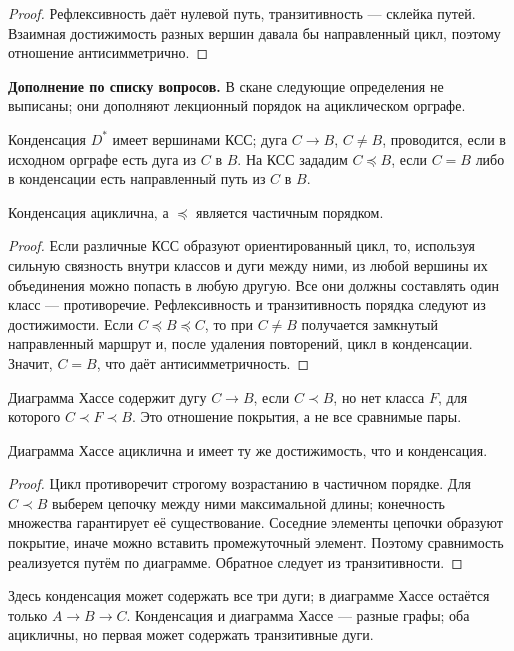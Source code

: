 \begin{proof}
Рефлексивность даёт нулевой путь, транзитивность — склейка путей.
Взаимная достижимость разных вершин давала бы направленный цикл,
поэтому отношение антисимметрично.
\end{proof}
\textbf{Дополнение по списку вопросов.} В скане следующие определения
не выписаны; они дополняют лекционный порядок на ациклическом орграфе.
\begin{definition}
Конденсация \(D^*\) имеет вершинами КСС; дуга \(C\to B\), \(C\ne B\),
проводится, если в исходном орграфе есть дуга из \(C\) в \(B\).
На КСС зададим \(C\preceq B\), если \(C=B\) либо в конденсации есть
направленный путь из \(C\) в \(B\).
\end{definition}
\begin{theorem}
Конденсация ациклична, а \(\preceq\) является частичным порядком.
\end{theorem}
\begin{proof}
Если различные КСС образуют ориентированный цикл, то, используя
сильную связность внутри классов и дуги между ними, из любой вершины
их объединения можно попасть в любую другую. Все они должны составлять
один класс — противоречие. Рефлексивность и транзитивность порядка
следуют из достижимости. Если \(C\preceq B\preceq C\), то при \(C\ne B\)
получается замкнутый направленный маршрут и, после удаления повторений,
цикл в конденсации. Значит, \(C=B\), что даёт антисимметричность.
\end{proof}


\begin{definition}
Диаграмма Хассе содержит дугу \(C\to B\), если \(C\prec B\), но нет
класса \(F\), для которого \(C\prec F\prec B\).
Это отношение покрытия, а не все сравнимые пары.
\end{definition}
\begin{lemma}
Диаграмма Хассе ациклична и имеет ту же достижимость, что и конденсация.
\end{lemma}
\begin{proof}
Цикл противоречит строгому возрастанию в частичном порядке.
Для \(C\prec B\) выберем цепочку между ними максимальной длины;
конечность множества гарантирует её существование. Соседние элементы
цепочки образуют покрытие, иначе можно вставить промежуточный элемент.
Поэтому сравнимость реализуется путём по диаграмме. Обратное следует из транзитивности.
\end{proof}
\begin{center}
\end{center}
Здесь конденсация может содержать все три дуги; в диаграмме Хассе
остаётся только \(A\to B\to C\). Конденсация и диаграмма Хассе —
разные графы; оба ацикличны, но первая может содержать транзитивные дуги.
